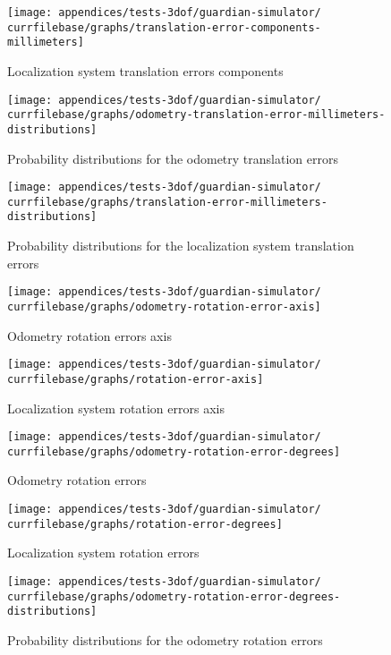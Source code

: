 \begin{figure}[H]
	\centering
	\texttt{[image: appendices/tests-3dof/guardian-simulator/\\currfilebase/graphs/translation-error-components-millimeters]}
	\caption{Localization system translation errors components}
\end{figure}



\begin{figure}[H]
	\centering
	\texttt{[image: appendices/tests-3dof/guardian-simulator/\\currfilebase/graphs/odometry-translation-error-millimeters-distributions]}
	\caption{Probability distributions for the odometry translation errors}
\end{figure}

\begin{figure}[H]
	\centering
	\texttt{[image: appendices/tests-3dof/guardian-simulator/\\currfilebase/graphs/translation-error-millimeters-distributions]}
	\caption{Probability distributions for the localization system translation errors}
\end{figure}


\begin{figure}[H]
	\centering
	\texttt{[image: appendices/tests-3dof/guardian-simulator/\\currfilebase/graphs/odometry-rotation-error-axis]}
	\caption{Odometry rotation errors axis}
\end{figure}

\begin{figure}[H]
	\centering
	\texttt{[image: appendices/tests-3dof/guardian-simulator/\\currfilebase/graphs/rotation-error-axis]}
	\caption{Localization system rotation errors axis}
\end{figure}


\begin{figure}[H]
	\centering
	\texttt{[image: appendices/tests-3dof/guardian-simulator/\\currfilebase/graphs/odometry-rotation-error-degrees]}
	\caption{Odometry rotation errors}
\end{figure}

\begin{figure}[H]
	\centering
	\texttt{[image: appendices/tests-3dof/guardian-simulator/\\currfilebase/graphs/rotation-error-degrees]}
	\caption{Localization system rotation errors}
\end{figure}


\begin{figure}[H]
	\centering
	\texttt{[image: appendices/tests-3dof/guardian-simulator/\\currfilebase/graphs/odometry-rotation-error-degrees-distributions]}
	\caption{Probability distributions for the odometry rotation errors}
\end{figure}

